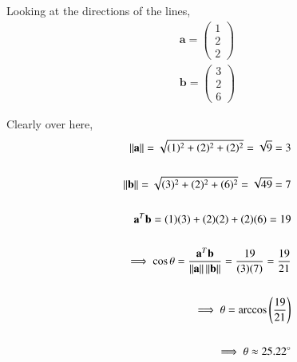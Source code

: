 %
Looking at the directions of the lines,
\begin{align}
   \textbf{a} = \begin{pmatrix}  1 \\  2  \\ 2 \end{pmatrix}
\\
   \textbf{b} = \begin{pmatrix}  3 \\  2  \\ 6 \end{pmatrix}
\end{align}

Clearly over here, 
\begin{align}
\left\lVert\mathbf{a}\right\rVert = \sqrt{(1)^{2}+(2)^{2}+ (2)^{2}} = \sqrt{9} = 3 
\\ \\
\left\lVert\mathbf{b}\right\rVert = \sqrt{(3)^{2}+(2)^{2}+ (6)^{2}} = \sqrt{49} = 7 
\\ \\ 
\mathbf{a}^{T}\mathbf{b} = (1)(3) + (2)(2) + (2)(6) = 19
\\ \\
\implies \cos{\theta} = \frac{\mathbf{a}^{T} \mathbf{b}}{\left\lVert\mathbf{a}\right\rVert \left\lVert\mathbf{b}\right\rVert} = \frac{19}{(3)(7)} = \frac{19}{21}
\\ \\
\implies \theta = \arccos{\Bigg( \frac{19}{21} \Bigg)}
\\ \\
\implies \theta \approx 25.22^{\circ}
\end{align}
